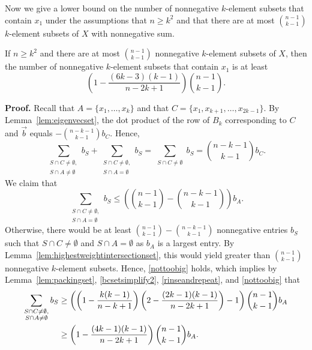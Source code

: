 \documentclass[12pt]{article}
\theoremstyle{plain}
{\theorembodyfont{\slshape}
\newtheorem{theorem}{Theorem}[section]
\newtheorem{lemma}[theorem]{Lemma}
\newtheorem{corollary}[theorem]{Corollary}}
\newcommand\lref[1]{Lemma~\ref{lem:#1}}
\begin{document}
Now we give a lower bound on the number of nonnegative $k$-element subsets that contain $x_{1}$ under the assumptions that $n \geq k^{2}$ and that there are at most $\binom{n-1}{k-1}$ $k$-element subsets of $X$ with nonnegative sum.

\begin{lemma}
\label{lem:lotson1sets}
If $n \geq k^{2}$ and there are at most $\binom{n-1}{k-1}$ nonnegative $k$-element subsets of $X$, then the number of nonnegative $k$-element subsets that contain $x_{1}$ is at least
\begin{equation}
\label{generallotson1set}
\left( 1 - \frac{(6k-3)(k-1)}{n-2k+1} \right) \binom{n-1}{k-1}.
\end{equation}
\end{lemma}

\noindent \textbf{Proof.} Recall that $A = \{x_{1}, \ldots, x_{k} \}$ and that $C = \{x_{1}, x_{k+1}, \ldots, x_{2k-1} \}$. By \lref{eigenvecset}, the dot product of the row of $B_{k}$ corresponding to $C$ and $\vec{b}$ equals $-\binom{n-k-1}{k-1} b_{C}$. Hence,
\begin{equation}
\label{rinseandrepeat}
\sum_{\substack{S \cap C \neq \emptyset, \\ S \cap A \neq \emptyset}} b_{S} + \sum_{\substack{S \cap C \neq \emptyset, \\ S \cap A = \emptyset}} b_{S} = \sum_{\substack{S \cap C \neq \emptyset}} b_{S} = \binom{n-k-1}{k-1} b_{C}.
\end{equation}
We claim that
\begin{equation}
\label{nottoobig}
\sum_{\substack{S \cap C \neq \emptyset, \\ S \cap A = \emptyset}} b_{S} \leq \left( \binom{n-1}{k-1} - \binom{n-k-1}{k-1} \right) b_{A}.
\end{equation}
Otherwise, there would be at least $\binom{n-1}{k-1} - \binom{n-k-1}{k-1}$ nonnegative entries $b_{S}$ such that $S \cap C \neq \emptyset$ and $S \cap A = \emptyset$ as $b_{A}$ is a largest entry. By \lref{highestweightintersectionset}, this would yield greater than $\binom{n-1}{k-1}$ nonnegative $k$-element subsets. Hence, \eqref{nottoobig} holds, which implies by \lref{packingset}, \eqref{bcsetsimplify2}, \eqref{rinseandrepeat}, and \eqref{nottoobig} that
\begin{align}
\label{prettybigset}
\sum_{\substack{S \cap C \neq \emptyset, \\ S \cap A \neq \emptyset}} b_{S} &\geq \left( \left(1 - \frac{k(k-1)}{n-k+1} \right) \left(2 - \frac{(2k-1)(k-1)}{n-2k+1} \right) - 1 \right) \binom{n-1}{k-1} b_{A} \notag \\
& \geq \left( 1 - \frac{(4k-1)(k-1)}{n-2k+1} \right) \binom{n-1}{k-1} b_{A}.
\end{align}
\end{document}

